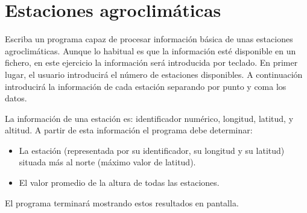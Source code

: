 \documentclass[a4paper]{article}
\begin{document}
\section{Estaciones agroclimáticas}
\label{sec:org9b45b29}

Escriba un programa capaz de procesar información básica de unas estaciones agroclimáticas. Aunque lo habitual es que la información esté disponible en un fichero, en este ejercicio la información será introducida por teclado. En primer lugar, el usuario introducirá el número de estaciones disponibles. A continuación introducirá la información de cada estación separando por punto y coma los datos. 

La información de una estación es: identificador numérico, longitud, latitud, y altitud.  A partir de esta información el programa debe determinar:
\begin{itemize}
\item La estación (representada por su identificador, su longitud y su latitud) situada más al norte (máximo valor de latitud).
\item El valor promedio de la altura de todas las estaciones.
\end{itemize}

El programa terminará mostrando estos resultados en pantalla.
\end{document}
